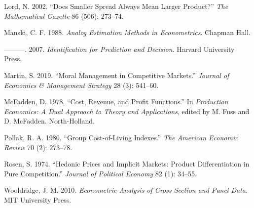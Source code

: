 \documentclass[]{article}
\begin{document}
\leavevmode\hypertarget{ref-lord2002}{}%
Lord, N. 2002. ``Does Smaller Spread Always Mean Larger Product?'' \emph{The Mathematical Gazette} 86 (506): 273--74.

\leavevmode\hypertarget{ref-manski1988}{}%
Manski, C. F. 1988. \emph{Analog Estimation Methods in Econometrics}. Chapman Hall.

\leavevmode\hypertarget{ref-manski2007}{}%
---------. 2007. \emph{Identification for Prediction and Decision}. Harvard University Press.

\leavevmode\hypertarget{ref-martin2019}{}%
Martin, S. 2019. ``Moral Management in Competitive Markets.'' \emph{Journal of Economics \& Management Strategy} 28 (3): 541--60.

\leavevmode\hypertarget{ref-mcfadden1978}{}%
McFadden, D. 1978. ``Cost, Revenue, and Profit Functions.'' In \emph{Production Economics: A Dual Approach to Theory and Applications}, edited by M. Fuss and D. McFadden. North-Holland.

\leavevmode\hypertarget{ref-pollak1980}{}%
Pollak, R. A. 1980. ``Group Cost-of-Living Indexes.'' \emph{The American Economic Review} 70 (2): 273--78.

\leavevmode\hypertarget{ref-rosen1974}{}%
Rosen, S. 1974. ``Hedonic Prices and Implicit Markets: Product Differentiation in Pure Competition.'' \emph{Journal of Political Economy} 82 (1): 34--55.

\leavevmode\hypertarget{ref-wooldridge2010}{}%
Wooldridge, J. M. 2010. \emph{Econometric Analysis of Cross Section and Panel Data}. MIT University Press.
\end{document}
